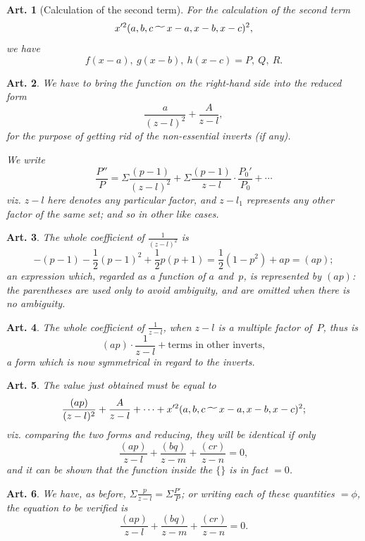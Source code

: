 \documentclass[11pt,a4paper]{article}
\theoremstyle{plain}
\newtheorem{art}{Art.}[section]
\begin{document}
\begin{art}[Calculation of the second term]
For the calculation of the second term
\[
x'^2 (a, b, c \,\raisebox{-.5ex}{$\widetilde{\phantom{aa}}$}\, x-a, x-b, x-c)^2,
\]
we have
\[
f(x-a),\ g(x-b),\ h(x-c) = P,\ Q,\ R.
\]
\end{art}

\begin{art}
We have to bring the function on the right-hand side into the reduced form
\[
\frac{a}{(z-l)^2} + \frac{A}{z-l},
\]
for the purpose of getting rid of the non-essential inverts (if any).

We write
\[
\frac{P''}{P} = \Sigma \frac{(p-1)}{(z-l)^2} + \Sigma \frac{(p-1)}{z-l} \cdot \frac{P_0'}{P_0} + \cdots
\]
viz. $z-l$ here denotes any particular factor, and $z-l_1$ represents any
other factor of the same set; and so in other like cases.
\end{art}

\begin{art}
The whole coefficient of $\frac{1}{(z-l)^2}$ is
\[
-(p-1) - \frac{1}{2}(p-1)^2 + \frac{1}{2}p(p+1) = \frac{1}{2}(1-p^2) + ap = (ap);
\]
an expression which, regarded as a function of $a$ and~$p$, is represented
by $(ap)$: the parentheses are used only to avoid ambiguity, and are
omitted when there is no ambiguity.
\end{art}

\begin{art}
The whole coefficient of $\frac{1}{z-l}$, when $z-l$ is a multiple factor
of~$P$, thus is
\[
(ap) \cdot \frac{1}{z-l} + \text{terms in other inverts},
\]
a form which is now symmetrical in regard to the inverts.
\end{art}

\begin{art}
The value just obtained must be equal to
\[
\frac{(ap)}{(z-l)^2} + \frac{A}{z-l} + \cdots + x'^2 (a, b, c \,\raisebox{-.5ex}{$\widetilde{\phantom{aa}}$}\, x-a, x-b, x-c)^2;
\]
viz. comparing the two forms and reducing, they will be identical if only
\[
\frac{(ap)}{z-l} + \frac{(bq)}{z-m} + \frac{(cr)}{z-n} = 0,
\]
and it can be shown that the function inside the $\{\}$ is in fact $=0$.
\end{art}

\begin{art}
We have, as before, $\Sigma \frac{p}{z-l} = \Sigma \frac{P'}{P}$; or writing each of
these quantities $= \phi$, the equation to be verified is
\[
\frac{(ap)}{z-l} + \frac{(bq)}{z-m} + \frac{(cr)}{z-n} = 0.
\]
\end{art}
\end{document}
